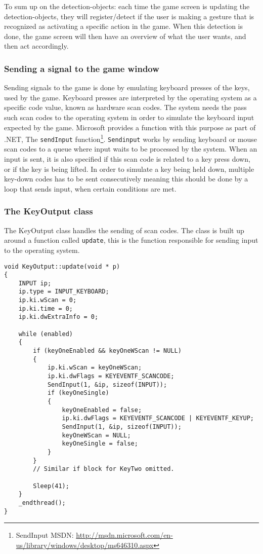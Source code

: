 To sum up on the detection-objects: each time the game screen is updating the detection-objects, they will register/detect if the user is making a gesture that is recognized as activating a specific action in the game. 
When this detection is done, the game screen will then have an overview of what the user wants, and then act accordingly. 


\subsubsection*{Sending a signal to the game window}
Sending signals to the game is done by emulating keyboard presses of the keys, used by the game. 
Keyboard presses are interpreted by the operating system as a specific code value, known as hardware scan codes. 
The system needs the pass such scan codes to the operating system in order to simulate the keyboard input expected
by the game. 
Microsoft provides a function with this purpose as part of .NET, The \texttt{sendInput} function\footnote{SendInput MSDN: \url{http://msdn.microsoft.com/en-us/library/windows/desktop/ms646310.aspx}}.
\texttt{Sendinput} works by sending keyboard or mouse scan codes to a queue where input waits to be processed by the
system. 
When an input is sent, it is also specified if this scan code is related to a key press down, or if the key is being lifted. 
In order to simulate a key being held down, multiple key-down codes has to be sent consecutively meaning this should be done by a loop that sends input, when certain conditions are met.

\subsubsection*{The KeyOutput class}
The KeyOutput class handles the sending of scan codes. The class is built up around a function called \texttt{update}, this is the function responsible for sending input to the operating system.
\bigskip

\begin{lstlisting}[caption=KeyOutput loop function, label=lst:lst11]
void KeyOutput::update(void * p) 
{ 
    INPUT ip;
    ip.type = INPUT_KEYBOARD;
    ip.ki.wScan = 0;
    ip.ki.time = 0;
    ip.ki.dwExtraInfo = 0;

    while (enabled)
    { 
        if (keyOneEnabled && keyOneWScan != NULL) 
        { 
            ip.ki.wScan = keyOneWScan;
            ip.ki.dwFlags = KEYEVENTF_SCANCODE;
            SendInput(1, &ip, sizeof(INPUT));
            if (keyOneSingle) 
            {
                keyOneEnabled = false;
                ip.ki.dwFlags = KEYEVENTF_SCANCODE | KEYEVENTF_KEYUP;
                SendInput(1, &ip, sizeof(INPUT));
                keyOneWScan = NULL;
                keyOneSingle = false; 
            } 
        }
        // Similar if block for KeyTwo omitted. 
        
        Sleep(41);
    } 
    _endthread(); 
}
\end{lstlisting}

